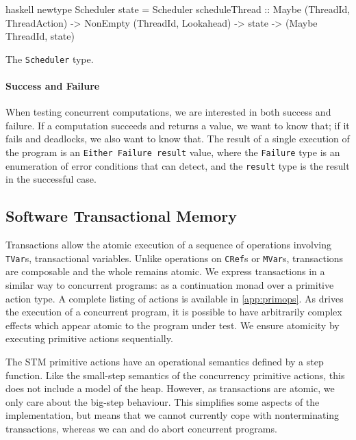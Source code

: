 \begin{listing}
\centering
\begin{cminted}{haskell}
newtype Scheduler state = Scheduler
  { scheduleThread
    :: Maybe (ThreadId, ThreadAction)
    -> NonEmpty (ThreadId, Lookahead)
    -> state
    -> (Maybe ThreadId, state)
  }
\end{cminted}
\caption{The \dejafu{} \texttt{Scheduler} type.}\label{lst:scheduler}
\end{listing}

\paragraph{Success and Failure}
When testing concurrent computations, we are interested in both
success and failure.  If a computation succeeds and returns a value,
we want to know that; if it fails and deadlocks, we also want to know
that.  The result of a single execution of the program is an
\verb|Either Failure result| value, where the \verb|Failure| type is
an enumeration of error conditions that \dejafu{} can detect, and the
\verb|result| type is the result in the successful case.

\subsection{Software Transactional Memory}

Transactions allow the atomic execution of a sequence of operations
involving \verb|TVar|s, transactional variables.  Unlike operations on
\verb|CRef|s or \verb|MVar|s, transactions are composable and the
whole remains atomic.  We express transactions in a similar way to
concurrent programs: as a continuation monad over a primitive action
type.  A complete listing of actions is available in
\cref{app:primops}.  As \dejafu{} drives the execution of a concurrent
program, it is possible to have arbitrarily complex effects which
appear atomic to the program under test.  We ensure atomicity by
executing primitive actions sequentially.

The STM primitive actions have an operational semantics defined by a
step function.  Like the small-step semantics of the concurrency
primitive actions, this does not include a model of the heap.
However, as transactions are atomic, we only care about the big-step
behaviour.  This simplifies some aspects of the implementation, but
means that we cannot currently cope with nonterminating transactions,
whereas we can and do abort concurrent programs.

